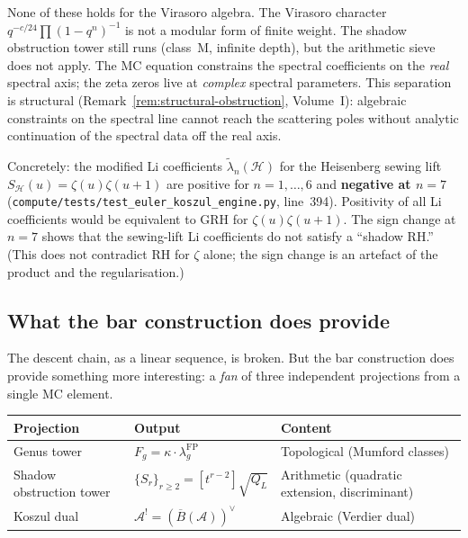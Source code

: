 \documentclass[11pt]{article}
\newcommand{\cA}{\mathcal{A}}
\newcommand{\cH}{\mathcal{H}}
\newcommand{\barB}{\overline{B}}
\begin{document}
None of these holds for the Virasoro algebra.  The Virasoro
character $q^{-c/24}\prod(1-q^n)^{-1}$ is not a modular form of
finite weight.  The shadow obstruction tower still runs (class~M, infinite
depth), but the arithmetic sieve does not apply.  The MC equation
constrains the spectral coefficients on the \emph{real} spectral
axis; the zeta zeros live at \emph{complex} spectral parameters.
This separation is structural
(Remark~\ref{rem:structural-obstruction}, Volume~I): algebraic
constraints on the spectral line cannot reach the scattering poles
without analytic continuation of the spectral data off the real
axis.

Concretely: the modified Li coefficients
$\tilde\lambda_n(\cH)$ for the Heisenberg sewing lift
$S_\cH(u) = \zeta(u)\zeta(u{+}1)$ are positive for
$n = 1, \ldots, 6$ and \textbf{negative at $n = 7$}
(\texttt{compute/tests/test\_euler\_koszul\_engine.py}, line~394).
Positivity of all Li coefficients would be equivalent to GRH for
$\zeta(u)\zeta(u{+}1)$.  The sign change at $n = 7$ shows that the
sewing-lift Li coefficients do not satisfy a ``shadow RH.''  (This
does not contradict RH for $\zeta$ alone; the sign change is an
artefact of the product and the regularisation.)

\subsection{What the bar construction does provide}

The descent chain, as a linear sequence, is broken.  But the
bar construction does provide something more interesting: a
\emph{fan} of three independent projections from a single
MC element.

\medskip

\begin{center}
\small
\begin{tabular}{@{}lll@{}}
\textbf{Projection} & \textbf{Output} & \textbf{Content} \\
\hline
Genus tower
  & $F_g = \kappa \cdot \lambda_g^{\mathrm{FP}}$
  & Topological (Mumford classes) \\[3pt]
Shadow obstruction tower
  & $\{S_r\}_{r \geq 2} = [t^{r-2}]\sqrt{Q_L}$
  & Arithmetic (quadratic extension, discriminant) \\[3pt]
Koszul dual
  & $\cA^! = (\barB(\cA))^\vee$
  & Algebraic (Verdier dual)
\end{tabular}
\end{center}

\medskip
\end{document}
